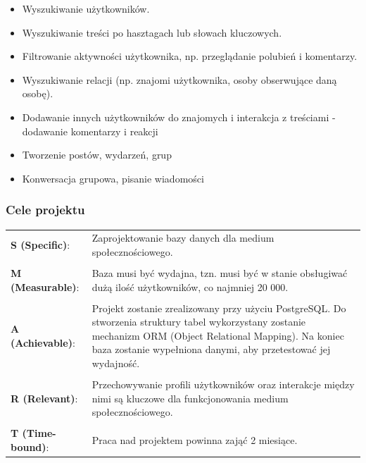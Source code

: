 \documentclass{article}
\begin{document}
\begin{itemize}
    \item Wyszukiwanie użytkowników.
    \item Wyszukiwanie treści po hasztagach lub słowach kluczowych.
    \item Filtrowanie aktywności użytkownika, np. przeglądanie polubień i komentarzy.
    \item Wyszukiwanie relacji (np. znajomi użytkownika, osoby obserwujące daną osobę).
    \item Dodawanie innych użytkowników do znajomych i interakcja z treściami - dodawanie komentarzy i reakcji
    \item Tworzenie postów, wydarzeń, grup
    \item Konwersacja grupowa, pisanie wiadomości
\end{itemize}

\subsubsection{Cele projektu}

\begin{tabular}{@{} l p{12cm} @{}}
    \textbf{S (Specific)}:   & Zaprojektowanie bazy danych dla medium społecznościowego.                                                                                                                                                                       \\ \\
    \textbf{M (Measurable)}: & Baza musi być wydajna, tzn. musi być w stanie obsługiwać dużą ilość użytkowników, co najmniej 20 000.                                                                                                                           \\ \\
    \textbf{A (Achievable)}: & Projekt zostanie zrealizowany przy użyciu PostgreSQL. Do stworzenia struktury tabel wykorzystany zostanie mechanizm ORM (Object Relational Mapping). Na koniec baza zostanie wypełniona danymi, aby przetestować jej wydajność. \\ \\
    \textbf{R (Relevant)}:   & Przechowywanie profili użytkowników oraz interakcje między nimi są kluczowe dla funkcjonowania medium społecznościowego.                                                                                                        \\ \\
    \textbf{T (Time-bound)}: & Praca nad projektem powinna zająć 2 miesiące.
\end{tabular}
\end{document}
